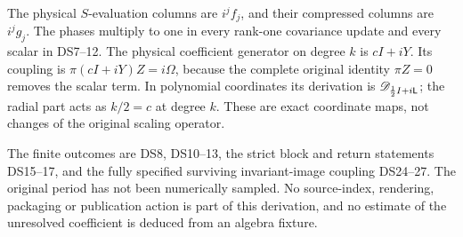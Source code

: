 \documentclass[11pt]{article}
\begin{document}
The physical \(S\)-evaluation columns are \(i^jf_j\), and their
compressed columns are \(i^jg_j\). The phases multiply to one in every
rank-one covariance update and every scalar in DS7--12. The physical
coefficient generator on degree \(k\) is
\(cI+iY\). Its coupling is
\(\pi(cI+iY)Z=i\Omega\), because the complete original identity
\(\pi Z=0\) removes the scalar term. In polynomial coordinates its
derivation is \(\mathscr D_{\frac12I+i\mathsf L}\); the radial part acts
as \(k/2=c\) at degree \(k\). These are exact coordinate maps,
not changes of the original scaling operator.

The finite outcomes are DS8, DS10--13, the strict block and return
statements DS15--17, and the fully specified surviving invariant-image
coupling DS24--27. The original period has not been numerically sampled.
No source-index, rendering, packaging or publication action is part of
this derivation, and no estimate of the unresolved coefficient is
deduced from an algebra fixture.
\end{document}
